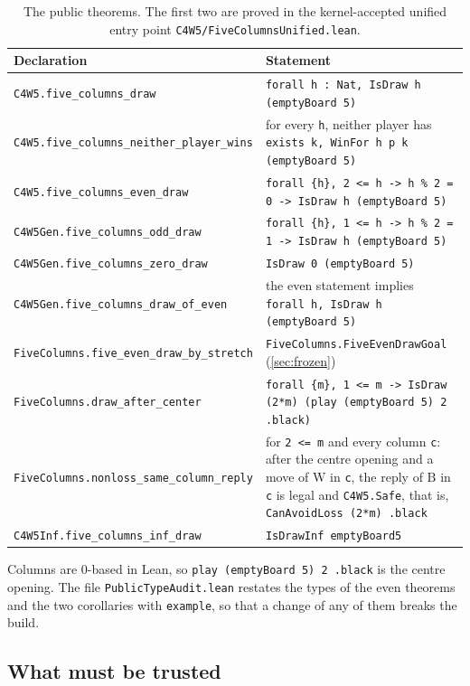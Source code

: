 \documentclass[11pt,a4paper]{article}
\theoremstyle{plain}
\theoremstyle{definition}
\newcommand{\code}[1]{{\upshape\texttt{\small\nolinkurl{#1}}}}
\newcommand{\B}{\mathrm{B}}
\newcommand{\W}{\mathrm{W}}
\newcommand{\lst}[1]{{\upshape\frenchspacing\texttt{\small #1}}}
\begin{document}
\begin{table}[!htbp]
\centering
\caption{The public theorems. The first two are proved in the kernel-accepted unified entry point \code{C4W5/FiveColumnsUnified.lean}.}
\label{tab:public}
\small
\begin{tabularx}{\linewidth}{@{}l Y@{}}
\toprule
\textbf{Declaration} & \textbf{Statement} \\
\midrule
\code{C4W5.five_columns_draw} & \lst{forall h : Nat, IsDraw h (emptyBoard 5)} \\
\code{C4W5.five_columns_neither_player_wins} & for every \lst{h}, neither player has \lst{exists k, WinFor h p k (emptyBoard 5)} \\
\code{C4W5.five_columns_even_draw} & \lst{forall \{h\}, 2 <= h -> h \% 2 = 0 -> IsDraw h (emptyBoard 5)} \\
\code{C4W5Gen.five_columns_odd_draw} & \lst{forall \{h\}, 1 <= h -> h \% 2 = 1 -> IsDraw h (emptyBoard 5)} \\
\code{C4W5Gen.five_columns_zero_draw} & \lst{IsDraw 0 (emptyBoard 5)} \\
\code{C4W5Gen.five_columns_draw_of_even} & the even statement implies \lst{forall h, IsDraw h (emptyBoard 5)} \\
\code{FiveColumns.five_even_draw_by_stretch} & \lst{FiveColumns.FiveEvenDrawGoal} (\cref{sec:frozen}) \\
\code{FiveColumns.draw_after_center} & \lst{forall \{m\}, 1 <= m -> IsDraw (2*m) (play (emptyBoard 5) 2 .black)} \\
\code{FiveColumns.nonloss_same_column_reply} & for \lst{2 <= m} and every column \lst{c}: after the centre opening and a move of $\W$ in \lst{c}, the reply of $\B$ in \lst{c} is legal and \lst{C4W5.Safe}, that is, \lst{CanAvoidLoss (2*m) .black} \\
\code{C4W5Inf.five_columns_inf_draw} & \lst{IsDrawInf emptyBoard5} \\
\bottomrule
\end{tabularx}
\end{table}

Columns are $0$-based in Lean, so \code{play (emptyBoard 5) 2 .black} is the centre opening. The file \code{PublicTypeAudit.lean} restates the types of the even theorems and the two corollaries with \code{example}, so that a change of any of them breaks the build.

\subsection{What must be trusted}
\label{sec:tcb}
\end{document}
